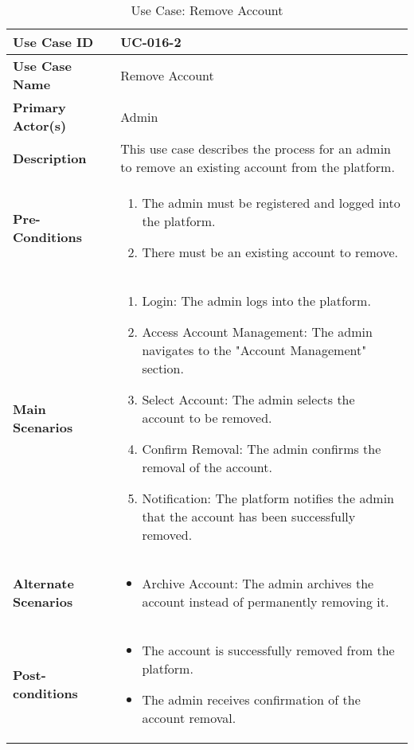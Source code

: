 \begin{table}[!ht]
    \centering
    \renewcommand{\arraystretch}{1.3} %
    \begin{tabularx}{\textwidth}{|l|X|}
        \hline
        \textbf{Use Case ID} & UC-016-2 \\
        \hline
        \textbf{Use Case Name} & Remove Account \\
        \hline
        \textbf{Primary Actor(s)} & Admin \\
        \hline
        \textbf{Description} & This use case describes the process for an admin to remove an existing account from the platform. \\
        \hline
        \textbf{Pre-Conditions} & 
        \begin{enumerate}[label=\arabic*.,itemsep=0pt]
            \item The admin must be registered and logged into the platform.
            \item There must be an existing account to remove.
        \end{enumerate} \\
        \hline
        \textbf{Main Scenarios} & 
        \begin{enumerate}[label=\arabic*.,itemsep=0pt]
            \item Login: The admin logs into the platform.
            \item Access Account Management: The admin navigates to the "Account Management" section.
            \item Select Account: The admin selects the account to be removed.
            \item Confirm Removal: The admin confirms the removal of the account.
            \item Notification: The platform notifies the admin that the account has been successfully removed.
        \end{enumerate} \\
        \hline
        \textbf{Alternate Scenarios} & 
        \begin{itemize}[label=--,itemsep=0pt]
            \item Archive Account: The admin archives the account instead of permanently removing it.
        \end{itemize} \\
        \hline
        \textbf{Post-conditions} & 
        \begin{itemize}[label=--,itemsep=0pt]
            \item The account is successfully removed from the platform.
            \item The admin receives confirmation of the account removal.
        \end{itemize} \\
        \hline
    \end{tabularx}
    \caption{Use Case: Remove Account}
    \label{tab:use-case-remove-account}
\end{table}

